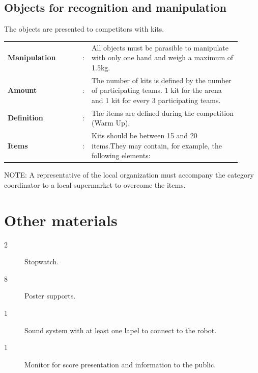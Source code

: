 \documentclass[11pt, twoside, openright, a4paper, chapterprefix]{article}
\begin{document}
\subsection{Objects for recognition and manipulation}

The objects are presented to competitors with kits.

\begin{tabular}{ p{0.3\linewidth} p{0.01\linewidth} p{0.6\linewidth}}
    \textbf{Manipulation}       & : & All objects must be parasible to manipulate with only one hand and weigh a maximum of 1.5kg. \\
    \textbf{Amount}             & : & The number of kits is defined by the number of participating teams. 1 kit for the arena and 1 kit for every 3 participating teams. \\
    \textbf{Definition}         & : & The items are defined during the competition (Warm Up). \\
    \textbf{Items}              & : & Kits should be between 15 and 20 items.They may contain, for example, the following elements: 
\end{tabular}


NOTE: A representative of the local organization must accompany the category coordinator to a local supermarket to overcome the items.

\section{Other materials}

\begin{description}
    \item [2] Stopwatch.
    \item [8] Poster supports.
    \item [1] Sound system with at least one lapel to connect to the robot.
    \item [1] Monitor for score presentation and information to the public.
\end{description}
\end{document}
